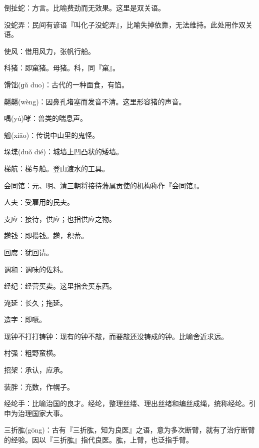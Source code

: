 \startbuffer[1908]
倒扯蛇：方言。比喻费劲而无效果。这里是双关语。
\stopbuffer


\startbuffer[1909]
没蛇弄：民间有谚语『叫化子没蛇弄』，比喻失掉依靠，无法维持。此处用作双关语。
\stopbuffer


\startbuffer[1910]
使风：借用风力，张帆行船。
\stopbuffer


\startbuffer[1911]
科猪：即窠猪。母猪。科，同『窠』。
\stopbuffer


\startbuffer[1912]
馉饳(ɡǔ duo)：古代的一种面食，有馅。
\stopbuffer


\startbuffer[1913]
齆齆(wèng)：因鼻孔堵塞而发音不清。这里形容猪的声音。
\stopbuffer


\startbuffer[1914]
喁(yú)哮：兽类的喘息声。
\stopbuffer


\startbuffer[1915]
魈(xiāo)：传说中山里的鬼怪。
\stopbuffer


\startbuffer[1916]
垛堞(duǒ dié)：城墙上凹凸状的矮墙。
\stopbuffer


\startbuffer[1917]
梯航：梯与船。登山渡水的工具。
\stopbuffer


\startbuffer[1918]
会同馆：元、明、清三朝将接待藩属贡使的机构称作『会同馆』。
\stopbuffer


\startbuffer[1919]
人夫：受雇用的民夫。
\stopbuffer


\startbuffer[1920]
支应：接待，供应；也指供应之物。
\stopbuffer


\startbuffer[1921]
趱钱：即攒钱。趱，积蓄。
\stopbuffer


\startbuffer[1922]
回席：犹回请。
\stopbuffer


\startbuffer[1923]
调和：调味的佐料。
\stopbuffer


\startbuffer[1924]
经纪：经营买卖。这里指会买东西。
\stopbuffer


\startbuffer[1925]
淹延：长久；拖延。
\stopbuffer


\startbuffer[1926]
造字：即噘。
\stopbuffer


\startbuffer[1927]
现钟不打打铸钟：现有的钟不敲，而要敲还没铸成的钟。比喻舍近求远。
\stopbuffer


\startbuffer[1928]
村强：粗野蛮横。
\stopbuffer


\startbuffer[1929]
招架：承认，应承。
\stopbuffer


\startbuffer[1930]
装胖：充数，作幌子。
\stopbuffer


\startbuffer[1931]
经纶手：比喻治国的良才。经纶，整理丝缕、理出丝绪和编丝成绳，统称经纶。引申为治理国家大事。
\stopbuffer


\startbuffer[1932]
三折肱(gōng)：古有『三折肱，知为良医』之语，意为多次断臂，就有了治疗断臂的经验。因以『三折肱』指代良医。肱，上臂，也泛指手臂。
\stopbuffer



